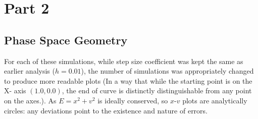 \documentclass{report}
\begin{document}
\pagebreak

\section*{Part 2}
\subsection*{Phase Space Geometry}
For each of these simulations, while step size coefficient was kept the same as earlier analysis ($h=0.01$), the number of simulations was appropriately changed to produce more readable plots (In a way that while the starting point is on the X- axis $(1.0,0.0)$, the end of curve is distinctly distinguishable from any point on the axes.). As $E=x^2 + v^2$ is ideally conserved, so $x$-$v$ plots are analytically circles: any deviations point to the existence and nature of errors.
\end{document}
